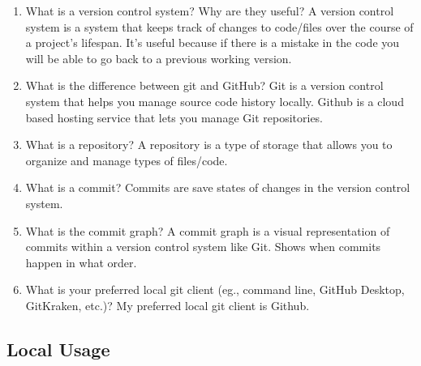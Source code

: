 \documentclass[10pt,twocolumn]{article}
\begin{document}
\begin{enumerate}
    \item What is a version control system? Why are they useful?
    \subitem A version control system is a system that keeps track of changes to code/files over the course of a project's lifespan. It's useful because if there is a mistake in the code you will be able to go back to a previous working version.

    \item What is the difference between git and GitHub?
    \subitem Git is a version control system that helps you manage source code history locally. Github is a cloud based hosting service that lets you manage Git repositories.
    
    \item What is a repository?
    \subitem A repository is a type of storage that allows you to organize and manage types of files/code. 
    
    \item What is a commit?
    \subitem Commits are save states of changes in the version control system.

    \item What is the commit graph?
    \subitem A commit graph is a visual representation of commits within a version control system like Git. Shows when commits happen in what order.
    
    
    \item What is your preferred local git client (eg., command line, GitHub Desktop, GitKraken, etc.)?
    \subitem My preferred local git client is Github.

\end{enumerate}

\subsection{Local Usage}
\end{document}
